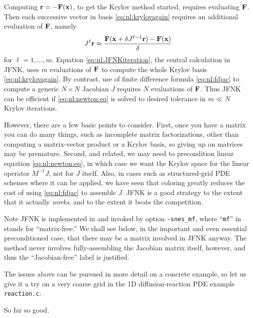 Computing $\mathbf{r} = - \mathbf{F}(\mathbf{x})$, to get the Krylov method started, requires evaluating $\mathbf{F}$.  Then each successive vector in basis \eqref{eq:nl:krylovagain} requires an additional evaluation of $\mathbf{F}$, namely
\begin{equation}
J^{\ell} \mathbf{r} \approx \frac{\mathbf{F}(\mathbf{x}+\delta J^{\ell-1}\mathbf{r}) - \mathbf{F}(\mathbf{x})}{\delta} \label{eq:nl:JFNKiteration}
\end{equation}
for $\ell=1,\dots,m$.  Equation \eqref{eq:nl:JFNKiteration}, the central calculation in JFNK, uses $m$ evaluations of $\mathbf{F}$ to compute the whole Krylov basis \eqref{eq:nl:krylovagain}.  By contrast, use of finite difference formula \eqref{eq:nl:fdjac} to compute a generic $N\times N$ Jacobian $J$ requires $N$ evaluations of $\mathbf{F}$.  Thus JFNK can be efficient if \eqref{eq:nl:newton:eq} is solved to desired tolerance in $m\ll N$ Krylov iterations.

However, there are a few basic points to consider.  First, once you have a matrix you can do many things, such as incomplete matrix factorizations, other than computing a matrix-vector product or a Krylov basis, so giving up on matrices may be premature.  Second, and related, we may need to precondition linear equation \eqref{eq:nl:newton:eq}, in which case we want the Krylov space for the linear operator $M^{-1}J$, not for $J$ itself.  Also, in cases such as structured-grid PDE schemes where it can be applied, we have seen that coloring greatly reduces the cost of using \eqref{eq:nl:fdjac} to assemble $J$.  JFNK is a good strategy to the extent that it actually \emph{works}, and to the extent it beats the competition.

Note JFNK is implemented in \PETSc and invoked by option \texttt{-snes\_mf}, where ``\texttt{mf}'' in stands for ``matrix-free.''  We shall see below, in the important and even essential preconditioned case, that there may be a matrix involved in JFNK anyway.  The method never involves fully-assembling the Jacobian matrix itself, however, and thus the ``Jacobian-free'' label is justified.

The issues above can be pursued in more detail on a concrete example, so let us give it a try on a very coarse grid in the 1D diffusion-reaction PDE example \texttt{reaction.c}:
So far so good.

